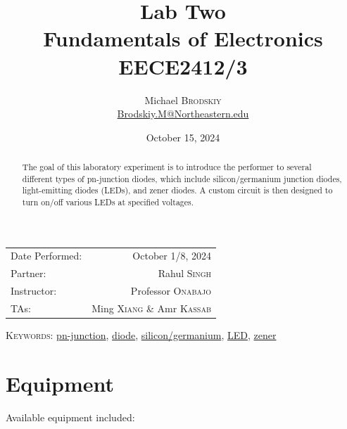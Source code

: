 \documentclass[
	letterpaper, %
	10pt, %
]{CSUniSchoolLabReport}
\title{Lab Two\\ Fundamentals of Electronics \\ EECE2412/3} %
\author{Michael \textsc{Brodskiy}\\ \small \href{mailto:Brodskiy.M@Northeastern.edu}{Brodskiy.M@Northeastern.edu}}
\date{October 15, 2024} %
\begin{document}
\maketitle %

\begin{center}
	\begin{tabular}{l r}
		Date Performed: & October 1/8, 2024 \\ %
        Partner: & Rahul \textsc{Singh} \\ %
		Instructor: & Professor \textsc{Onabajo} \\ %
        TAs: & Ming \textsc{Xiang} \& Amr \textsc{Kassab} \\ %
	\end{tabular}
\end{center}

\newpage

\begin{abstract}

  The goal of this laboratory experiment is to introduce the performer to several different types of pn-junction diodes, which include silicon/germanium junction diodes, light-emitting diodes (LEDs), and zener diodes. A custom circuit is then designed to turn on/off various LEDs at specified voltages.

\end{abstract}

\begin{flushleft}

  \textsc{Keywords:} \underline{pn-junction}, \underline{diode}, \underline{silicon/germanium}, \underline{LED}, \underline{zener}

\end{flushleft}

\newpage

\tableofcontents
\listoffigures

\newpage

\section{Equipment}

Available equipment included:\\
\end{document}
